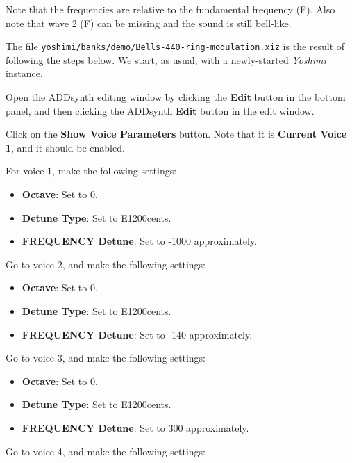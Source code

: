    Note that the frequencies are relative to the fundamental frequency (F).
   Also note that wave 2 (F) can be missing and the sound is still
   bell-like.

   The file \texttt{yoshimi/banks/demo/Bells-440-ring-modulation.xiz} is the
   result of following the steps below.  We start, as usual, with a
   newly-started \textsl{Yoshimi} instance.

   \begin{enumber}
      \item Open the ADDsynth editing window by clicking the \textbf{Edit}
         button in the bottom panel, and then clicking the ADDsynth
         \textbf{Edit} button in the edit window.
      \item Click on the \textbf{Show Voice Parameters} button.
         Note that it is \textbf{Current Voice 1}, and it should be enabled.
      \item For voice 1, make the following settings:
         \begin{itemize}
            \item \textbf{Octave}: Set to 0.
            \item \textbf{Detune Type}: Set to E1200cents.
            \item \textbf{FREQUENCY Detune}: Set to -1000 approximately.
         \end{itemize}
      \item Go to voice 2, and make the following settings:
         \begin{itemize}
            \item \textbf{Octave}: Set to 0.
            \item \textbf{Detune Type}: Set to E1200cents.
            \item \textbf{FREQUENCY Detune}: Set to -140 approximately.
         \end{itemize}
      \item Go to voice 3, and make the following settings:
         \begin{itemize}
            \item \textbf{Octave}: Set to 0.
            \item \textbf{Detune Type}: Set to E1200cents.
            \item \textbf{FREQUENCY Detune}: Set to 300 approximately.
         \end{itemize}
      \item Go to voice 4, and make the following settings:
         \begin{itemize}

\end{itemize}
\end{enumber}

